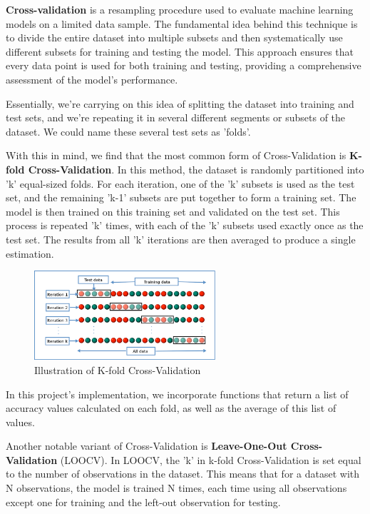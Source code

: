 \documentclass[letterpaper,10pt]{article}
\begin{document}
\textbf{Cross-validation} is a resampling procedure used to evaluate machine learning models on a limited data sample. The fundamental idea behind this technique is to divide the entire dataset into multiple subsets and then systematically use different subsets for training and testing the model. This approach ensures that every data point is used for both training and testing, providing a comprehensive assessment of the model's performance. \par

Essentially, we're carrying on this idea of splitting the dataset into training and test sets, and we're repeating it in several different segments or subsets of the dataset. We could name these several test sets as 'folds'. \par

With this in mind, we find that the most common form of Cross-Validation is \textbf{K-fold Cross-Validation}. In this method, the dataset is randomly partitioned into 'k' equal-sized folds. For each iteration, one of the 'k' subsets is used as the test set, and the remaining 'k-1' subsets are put together to form a training set. The model is then trained on this training set and validated on the test set. This process is repeated 'k' times, with each of the 'k' subsets used exactly once as the test set. The results from all 'k' iterations are then averaged to produce a single estimation. \par

\begin{figure}[ht]
    \centering
    \includegraphics[width=0.6\textwidth]{KFolds.png}
    \caption{Illustration of K-fold Cross-Validation}
    \label{fig:kfolds}
\end{figure}

In this project's implementation, we incorporate functions that return a list of accuracy values calculated on each fold, as well as the average of this list of values. \par

Another notable variant of Cross-Validation is \textbf{Leave-One-Out Cross-Validation} (LOOCV). In LOOCV, the 'k' in k-fold Cross-Validation is set equal to the number of observations in the dataset. This means that for a dataset with N observations, the model is trained N times, each time using all observations except one for training and the left-out observation for testing. \par
\end{document}
